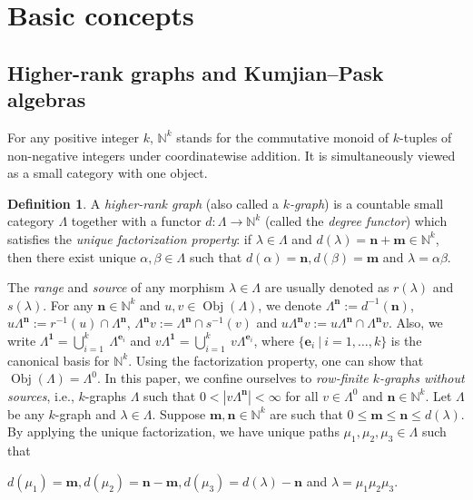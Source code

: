 \documentclass[12pt]{amsart}
\newcommand{\N}{\mathbf{n}}
\newcommand{\Obj}{\operatorname{Obj}}
\theoremstyle{definition}
\newtheorem{dfn}[thm]{Definition}
\theoremstyle{remark}
\begin{document}
\section{Basic concepts}\label{sec basics}
\subsection{Higher-rank graphs and Kumjian--Pask algebras}\label{ssec k-graphs}
For any positive integer $k$, $\mathbb{N}^k$ stands for the commutative monoid of $k$-tuples of non-negative integers under coordinatewise addition. It is simultaneously viewed as a small category with one object.
\begin{dfn}\label{def higher-rank graph}
A \emph{higher-rank graph} (also called a \emph{$k$-graph}) is a countable small category $\Lambda$ together with a functor $d:\Lambda\longrightarrow \mathbb{N}^k$ (called the \emph{degree functor}) which satisfies the \emph{unique factorization property}: if $\lambda\in \Lambda$ and $d(\lambda)=\mathbf{n}+\mathbf{m}\in \mathbb{N}^k$, then there exist unique $\alpha,\beta\in \Lambda$ such that $d(\alpha)=\mathbf{n},d(\beta)=\mathbf{m}$ and $\lambda=\alpha\beta$.    
\end{dfn} 

The \emph{range} and \emph{source} of any morphism $\lambda\in \Lambda$ are usually denoted as $r(\lambda)$ and $s(\lambda)$. For any $\mathbf{n}\in \mathbb{N}^k$ and $u,v\in \Obj(\Lambda)$, we denote $\Lambda^\mathbf{n}:=d^{-1}(\mathbf{n})$, $u\Lambda^\mathbf{n}:=r^{-1}(u)\cap \Lambda^\mathbf{n}$, $\Lambda^\mathbf{n} v:=\Lambda^\mathbf{n}\cap s^{-1}(v)$ and $u\Lambda^\mathbf{n} v:=u\Lambda^\mathbf{n} \cap \Lambda^\mathbf{n} v$. Also, we write $\Lambda^\mathbf{1}=\displaystyle{\bigcup_{i=1}^{k}}~\Lambda^{\mathbf{e}_i}$ and $v\Lambda^\mathbf{1}=\displaystyle{\bigcup_{i=1}^{k}}~v\Lambda^{\mathbf{e}_i}$, where $\{ \mathbf{e}_i~|~ i = 1 , \ldots , k \}$ is the canonical basis for $\mathbb{N}^k$. Using the factorization property, one can show that $\Obj(\Lambda)=\Lambda^0$. In this paper, we confine ourselves to \emph{row-finite $k$-graphs without sources}, i.e., $k$-graphs $\Lambda$ such that $0<|v\Lambda^\mathbf{n}|< \infty$ for all $v\in \Lambda^0$ and $\N\in \mathbb{N}^k$. Let $\Lambda$ be any $k$-graph and $\lambda\in \Lambda$. Suppose $\mathbf{m},\mathbf{n}\in \mathbb{N}^k$ are such that $0\le \mathbf{m}\le \mathbf{n}\le d(\lambda)$. By applying the unique factorization, we have unique paths $\mu_1,\mu_2,\mu_3\in \Lambda$ such that 
\begin{center}
    $d(\mu_1)=\mathbf{m},d(\mu_2)=\mathbf{n}-\mathbf{m}, d(\mu_3)=d(\lambda)-\mathbf{n}$ and $\lambda=\mu_1\mu_2\mu_3$.
\end{center}
\end{document}
